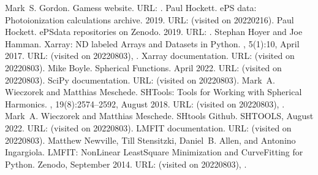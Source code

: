 \documentclass[letterpaper,table,10pt,english]{jupyterBook}
\begin{document}
\begin{sphinxthebibliography}{10}
\sphinxAtStartPar
Mark S. Gordon. Gamess website. URL: .
\sphinxAtStartPar
Paul Hockett. ePS data: Photoionization calculations archive. 2019. URL:  (visited on 2022\sphinxhyphen{}02\sphinxhyphen{}16).
\sphinxAtStartPar
Paul Hockett. ePSdata repositories on Zenodo. 2019. URL: .
\sphinxAtStartPar
Stephan Hoyer and Joe Hamman. Xarray: N\sphinxhyphen{}D labeled Arrays and Datasets in Python. , 5(1):10, April 2017. URL:  (visited on 2022\sphinxhyphen{}08\sphinxhyphen{}03), .
\sphinxAtStartPar
Xarray documentation. URL:  (visited on 2022\sphinxhyphen{}08\sphinxhyphen{}03).
\sphinxAtStartPar
Mike Boyle. Spherical Functions. April 2022. URL:  (visited on 2022\sphinxhyphen{}08\sphinxhyphen{}03).
\sphinxAtStartPar
SciPy documentation. URL:  (visited on 2022\sphinxhyphen{}08\sphinxhyphen{}03).
\sphinxAtStartPar
Mark A. Wieczorek and Matthias Meschede. SHTools: Tools for Working with Spherical Harmonics. , 19(8):2574–2592, August 2018. URL:  (visited on 2022\sphinxhyphen{}08\sphinxhyphen{}03), .
\sphinxAtStartPar
Mark A. Wieczorek and Matthias Meschede. SHtools Github. SHTOOLS, August 2022. URL:  (visited on 2022\sphinxhyphen{}08\sphinxhyphen{}03).
\sphinxAtStartPar
LMFIT documentation. URL:  (visited on 2022\sphinxhyphen{}08\sphinxhyphen{}03).
\sphinxAtStartPar
Matthew Newville, Till Stensitzki, Daniel B. Allen, and Antonino Ingargiola. LMFIT: Non\sphinxhyphen{}Linear Least\sphinxhyphen{}Square Minimization and Curve\sphinxhyphen{}Fitting for Python. Zenodo, September 2014. URL:  (visited on 2022\sphinxhyphen{}08\sphinxhyphen{}03), .

\end{sphinxthebibliography}
\end{document}
